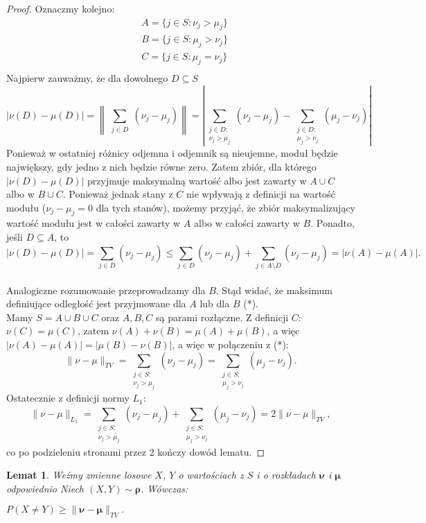 \documentclass[a4paper]{article}
\theoremstyle{defn}
\theoremstyle{theorem}
\theoremstyle{lemma}
\newtheorem{lemma}[defn]{Lemat}
\theoremstyle{cor}
\theoremstyle{fact}
\begin{document}
\begin{proof}
Oznaczmy kolejno: \begin{align*}
&A = \{j \in S: \nu_j > \mu_j\}\\
&B = \{j \in S: \mu_j > \nu_j\}\\
&C = \{j \in S: \mu_j = \nu_j\}\\
\end{align*}
Najpierw zauważmy, że dla dowolnego $D \subseteq S$ $$|\nu(D) - \mu(D)| =  \left\| \sum\limits_{\substack{j \in D}} (\nu_j - \mu_j) \right\| =  \left\lvert \sum\limits_{\substack{j \in D:\\ \nu_j > \mu_j}} (\nu_j - \mu_j) - \sum\limits_{\substack{j \in D:\\ \mu_j > \nu_j}} (\mu_j - \nu_j) \right\rvert$$
Ponieważ w ostatniej różnicy odjemna i odjemnik są nieujemne, moduł będzie największy, gdy jedno z nich będzie równe zero. Zatem zbiór, dla którego $|\nu(D) - \mu(D)|$ przyjmuje maksymalną wartość albo jest zawarty w $A \cup C$ albo w $B \cup C$. Ponieważ jednak stany z $C$ nie wpływają z definicji na wartość modułu ($\nu_j - \mu_j = 0$ dla tych stanów), możemy przyjąć, że zbiór maksymalizujący wartość modułu jest w całości zawarty w $A$ albo w całości zawarty w $B$. Ponadto, jeśli $D \subseteq A$, to
$$|\nu(D) - \mu(D)| = \sum\limits_{j \in D} (\nu_j - \mu_j) \leq \sum\limits_{j \in D} (\nu_j - \mu_j) + \sum\limits_{j \in A \setminus D} (\nu_j - \mu_j) = |\nu(A) - \mu(A)|.$$\\
Analogiczne rozumowanie przeprowadzamy dla $B$. Stąd widać, że maksimum definiujące odległość jest przyjmowane dla $A$ lub dla $B$ (*). \\
Mamy $S = A \cup B \cup C$ oraz $A, B, C$ są parami rozłączne. Z definicji $C$: $\nu(C) = \mu(C)$, zatem $\nu(A) + \nu(B) = \mu(A) + \mu(B)$, a więc $|\nu(A) - \mu(A)| = |\mu(B) - \nu(B)|$, a więc w połączeniu z (*):
$$\|\nu - \mu\|_{TV} = \sum\limits_{\substack{j \in S:\\ \nu_j > \mu_j}} (\nu_j - \mu_j) = \sum\limits_{\substack{j \in S:\\ \mu_j > \nu_j}} (\mu_j - \nu_j).$$
Ostatecznie z definicji normy $L_1$:
$$\|\nu - \mu\|_{L_1} = \sum\limits_{\substack{j \in S:\\ \nu_j > \mu_j}} (\nu_j - \mu_j) + \sum\limits_{\substack{j \in S:\\ \mu_j > \nu_j}} (\mu_j - \nu_j) = 2\|\nu - \mu\|_{TV},$$
co po podzieleniu stronami przez 2 kończy dowód lematu.
\end{proof}
\begin{lemma}\label{lemma2.4.4}
Weźmy zmienne losowe $X$, $Y$ o wartościach z $S$ i o rozkładach $\boldsymbol{\nu}$ i $\boldsymbol{\mu}$ odpowiednio Niech $(X, Y) \sim \boldsymbol{\rho}$. Wówczas:
\begin{center}
$P(X \neq Y) \geq \|\boldsymbol{\nu} - \boldsymbol{\mu}\|_{TV}.$
\end{center}
\end{lemma}
\end{document}
